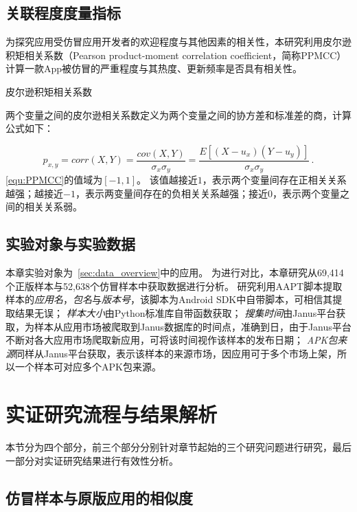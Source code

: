 \subsection{关联程度度量指标}

为探究应用受仿冒应用开发者的欢迎程度与其他因素的相关性，本研究利用皮尔逊积矩相关系数（Pearson product-moment correlation coefficient，简称PPMCC）计算一款App被仿冒的严重程度与其热度、更新频率是否具有相关性。

\begin{Def}
    皮尔逊积矩相关系数

    两个变量之间的皮尔逊相关系数定义为两个变量之间的协方差和标准差的商，计算公式如下：
\end{Def}
\begin{equation}
    p_{x,y} = corr(X,Y)=\frac{cov(X,Y)}{\sigma_x\sigma_y}=\frac{E[(X-u_x)(Y-u_y)]}{\sigma_x\sigma_y} \,.
    \label{equ:PPMCC}
\end{equation}
\autoref{equ:PPMCC}的值域为$[-1, 1]$。
该值越接近$1$，表示两个变量间存在正相关关系越强；越接近$-1$，表示两变量间存在的负相关关系越强；接近$0$，表示两个变量之间的相关关系弱。

\subsection{实验对象与实验数据}

本章实验对象为~\autoref{sec:data_overview}中的应用。
为进行对比，本章研究从69,414个正版样本与52,638个仿冒样本中获取数据进行分析。
研究利用AAPT脚本提取样本的\emph{应用名}，\emph{包名}与\emph{版本号}，该脚本为Android SDK中自带脚本，可相信其提取结果无误；
\emph{样本大小}由Python标准库自带函数获取；
\emph{搜集时间}由Janus平台获取，为样本从应用市场被爬取到Janus数据库的时间点，准确到日，由于Janus平台不断对各大应用市场爬取新应用，可将该时间视作该样本的发布日期；
\emph{APK包来源}同样从Janus平台获取，表示该样本的来源市场，因应用可于多个市场上架，所以一个样本可对应多个APK包来源。

\section{实证研究流程与结果解析}

本节分为四个部分，前三个部分分别针对章节起始的三个研究问题进行研究，最后一部分对实证研究结果进行有效性分析。

\subsection{仿冒样本与原版应用的相似度}

